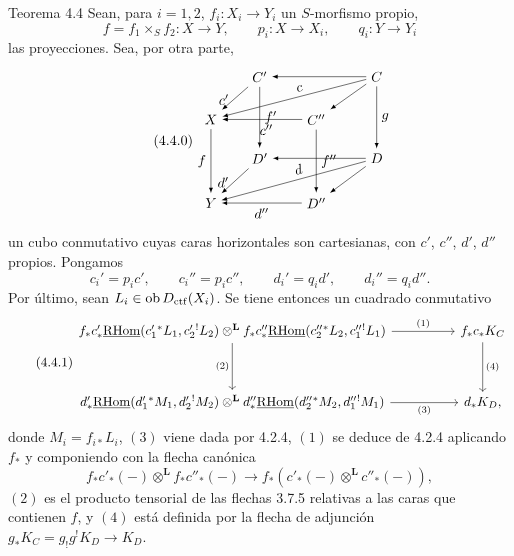 \begin{statement}{Teorema 4.4}
Sean, para $i=1,2$, $f_i:X_i\longrightarrow Y_i$ un $S$-morfismo propio,
\[
f=f_1\times_S f_2:X\longrightarrow Y,\qquad
p_i:X\longrightarrow X_i,\qquad q_i:Y\longrightarrow Y_i
\]
las proyecciones. Sea, por otra parte,
\begin{equation}
\tag{4.4.0}
\begin{tikzpicture}[>=latex,baseline=(current bounding box.center),scale=0.98]
\node (Cp) at (0,2.1) {$C'$};
\node (C) at (3.0,2.1) {$C$};
\node (X) at (-1.25,1.0) {$X$};
\node (Cpp) at (1.45,1.0) {$C''$};
\node (Dp) at (0,0) {$D'$};
\node (D) at (3.0,0) {$D$};
\node (Y) at (-1.25,-1.15) {$Y$};
\node (Dpp) at (1.45,-1.15) {$D''$};
\draw[->] (C) -- (Cp);
\draw[->] (Cp) -- node[left,pos=.55] {$c'$} (X);
\draw[->] (C) -- node[above,sloped,pos=.45] {$c$} (X);
\draw[->] (C) -- (Cpp);
\draw[->] (Cpp) -- node[below,pos=.45] {$c''$} (X);
\draw[->] (Cp) -- node[right] {$f'$} (Dp);
\draw[->] (Cpp) -- node[right] {$f''$} (Dpp);
\draw[->] (C) -- node[right] {$g$} (D);
\draw[->] (X) -- node[left] {$f$} (Y);
\draw[->] (D) -- (Dp);
\draw[->] (Dp) -- node[left,pos=.55] {$d'$} (Y);
\draw[->] (D) -- node[above,sloped,pos=.45] {$d$} (Y);
\draw[->] (D) -- (Dpp);
\draw[->] (Dpp) -- node[below] {$d''$} (Y);
\end{tikzpicture}
\end{equation}
un cubo conmutativo cuyas caras horizontales son cartesianas, con $c'$, $c''$, $d'$, $d''$ propios. Pongamos
\[
c_i'=p_i c',\qquad c_i''=p_i c'',\qquad d_i'=q_i d',\qquad d_i''=q_i d''.
\]
Por último, sean $L_i\in\operatorname{ob} D_{\mathrm{ctf}}(X_i)$. Se tiene entonces un cuadrado conmutativo
\begin{equation}
\tag{4.4.1}
\begin{tikzcd}[column sep=huge,row sep=huge]
f_*c'_*\uRHom(c_1'{}^*L_1,c_2'{}^!L_2)\otimes^{\mathbf L}
f_*c''_*\uRHom(c_2''{}^*L_2,c_1''{}^!L_1)
 \arrow[r,"(1)"] \arrow[d,"(2)"'] &
f_*c_*K_C \arrow[d,"(4)"] \\
d'_*\uRHom(d_1'{}^*M_1,d_2'{}^!M_2)\otimes^{\mathbf L}
d''_*\uRHom(d_2''{}^*M_2,d_1''{}^!M_1)
 \arrow[r,"(3)"'] &
d_*K_D ,
\end{tikzcd}
\end{equation}
donde $M_i=f_{i*}L_i$, $(3)$ viene dada por 4.2.4, $(1)$ se deduce de 4.2.4 aplicando $f_*$ y componiendo con la flecha canónica
\[
f_*c'_*(-)\otimes^{\mathbf L} f_*c''_*(-)\longrightarrow f_*(c'_*(-)\otimes^{\mathbf L}c''_*(-)),
\]
$(2)$ es el producto tensorial de las flechas 3.7.5 relativas a las caras que contienen $f$, y $(4)$ está definida por la flecha de adjunción $g_*K_C=g_!g^!K_D\longrightarrow K_D$.
\end{statement}

